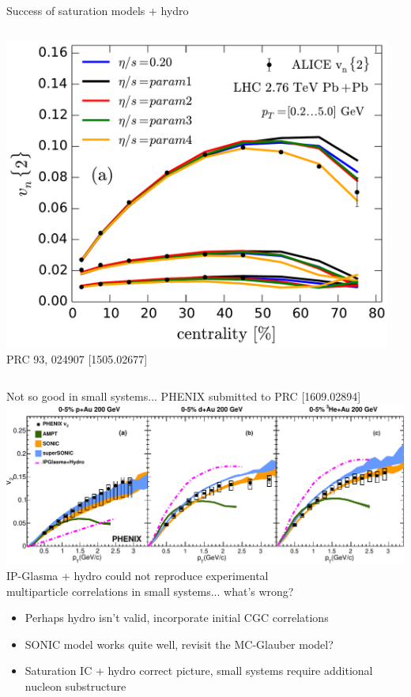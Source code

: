 \documentclass[aspectratio=43]{beamer}
\theoremstyle{definition}
\begin{document}
\begin{frame}[plain]{Success of saturation models + hydro}
\begin{columns}
\begin{column}{.4\textwidth}
      \includegraphics[width=.91\columnwidth]{vn_ekrt} \\
      {\tiny PRC 93, 024907 [1505.02677]}
    \end{column}
    \begin{column}{.075\textwidth}
    \end{column}
  \end{columns}
\end{frame}


\begin{frame}{Not so good in small systems...}
  \centering
  {\tiny PHENIX submitted to PRC [1609.02894]} \\
  \includegraphics[width=.85\columnwidth]{phenix_models} \\[1ex]
  \small IP-Glasma + hydro could not reproduce experimental\\multiparticle correlations in small systems... what's wrong? \\[1ex]
  \begin{itemize}
    \item Perhaps hydro isn't valid, incorporate initial CGC correlations
    \item SONIC model works quite well, revisit the MC-Glauber model?
    \item Saturation IC + hydro correct picture, small systems require additional nucleon substructure
  \end{itemize}
\end{frame}
\end{document}
